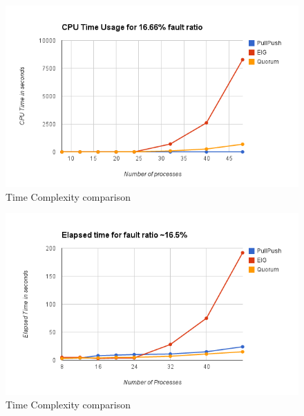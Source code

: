 \begin{figure}[ht]
 \centering
\includegraphics[scale=0.4]{cpu16}
\caption{Time Complexity comparison}
 \label{fig:cpu}
\end{figure}

\begin{figure}[ht]
 \centering
\includegraphics[scale=0.4]{elapsed16}
\caption{Time Complexity comparison}
 \label{fig:elapsed}
\end{figure}


%


